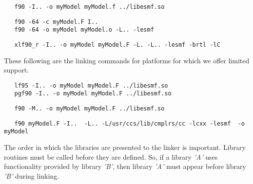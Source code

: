 
\begin{verbatim}
   f90 -I.. -o myModel myModel.f ../libesmf.so
\end{verbatim}


\begin{verbatim}
   f90 -64 -c myModel.F I.. 
   f90 -64 -o myModel myModel.o -L.. -lesmf
\end{verbatim}


\begin{verbatim}
   xlf90_r -I.. -o myModel myModel.F -L. -L.. -lesmf -brtl -lC
\end{verbatim}

These following are the linking commands for platforms for which 
we offer limited support.

 
\begin{verbatim}
   lf95 -I.. -o myModel myModel.F ../libesmf.so
   pgf90 -I.. -o myModel myModel.F ../libesmf.so
\end{verbatim}


\begin{verbatim}
   f90 -M.. -o myModel myModel.F ../libesmf.so
\end{verbatim}


\begin{verbatim}
   f90 myModel.F -I..  -L.. -L/usr/ccs/lib/cmplrs/cc -lcxx -lesmf  -o myModel
\end{verbatim}

The order in which the libraries are presented to the linker is important. Library routines must be called before they are defined. So, if a library \emph{'A'} uses functionality provided by library \emph{'B'}, then library \emph{'A'} must appear before library \emph{'B'} during linking. 







